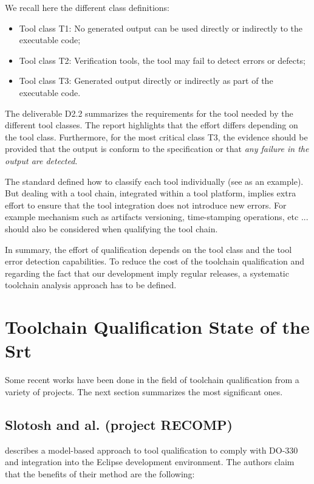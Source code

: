 \documentclass{openetcs_report}
\begin{document}
We recall here the different class definitions:
\begin{itemize}
\item Tool class T1: No generated output can be used directly or indirectly to the
  executable code;
\item Tool class T2: Verification tools, the tool may fail to detect errors or
  defects;
\item Tool class T3: Generated output directly or indirectly  as part of the
  executable code.
\end{itemize}
The deliverable D2.2 \cite{pokam_report_2013} summarizes the requirements for the
tool needed by the different tool classes. The report highlights that the
effort differs depending on the tool class. Furthermore, for
the most critical class T3,  the evidence should be provided that the output is
conform to the specification or that \emph{any failure in the output
  are detected}. 

The standard defined how to classify each tool individually (see
\cite{nielsen_efficient_2012,huang_test_2013} as an example).  But dealing with a tool
chain, integrated within a tool platform, implies extra effort to
ensure that the tool integration does not introduce new errors. For
example mechanism such as artifacts versioning, time-stamping
operations, etc ... should also be considered when qualifying the tool
chain.

In summary, the effort of qualification depends on the tool class and the tool
error detection capabilities. To reduce the cost of the toolchain qualification
and regarding the fact that our development imply regular releases, a systematic
toolchain analysis approach has to be defined.
 
\section{Toolchain Qualification State of the Srt}
\label{sec-1-2}
Some recent works have been done in the field of toolchain
qualification from a variety of projects. The next section summarizes
the most significant ones.

\subsection{Slotosh and al. (project RECOMP)}
\label{sec-1-2.1}

 \cite{slotosch_model-based_2012} describes a model-based approach to tool
 qualification to comply with DO-330 and integration into the Eclipse
 development environment. The authors claim that the benefits of their
 method  are the following:
\end{document}
